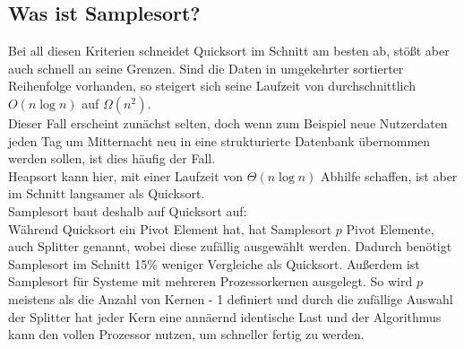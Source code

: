     \subsection{Was ist Samplesort?}
    	Bei all diesen Kriterien schneidet Quicksort im Schnitt am besten ab, stößt aber auch schnell an seine Grenzen. Sind die Daten in umgekehrter sortierter Reihenfolge vorhanden, so steigert sich seine Laufzeit von durchschnittlich $O(n\log{n})$ auf $\Omega(n^2)$.\\
    	Dieser Fall erscheint zunächst selten, doch wenn zum Beispiel neue Nutzerdaten jeden Tag um Mitternacht neu in eine strukturierte Datenbank übernommen werden sollen, ist dies häufig der Fall.\\
    	Heapsort kann hier, mit einer Laufzeit von $\Theta(n\log{n})$ Abhilfe schaffen, ist aber im Schnitt langsamer als Quicksort.\\
    	Samplesort baut deshalb auf Quicksort auf:\\
    	Während Quicksort ein Pivot Element hat, hat Samplesort $p$ Pivot Elemente, auch Splitter genannt, wobei diese zufällig ausgewählt werden.
    	Dadurch benötigt Samplesort im Schnitt 15\% weniger Vergleiche als Quicksort. \autocite{frazer-1970}
    	Außerdem ist Samplesort für Systeme mit mehreren Prozessorkernen ausgelegt.
    	So wird $p$ meistens als die Anzahl von Kernen - 1 definiert und durch die zufällige Auswahl der Splitter hat jeder Kern eine annäernd identische Last und der Algorithmus kann den vollen Prozessor nutzen, um schneller fertig zu werden.
    
